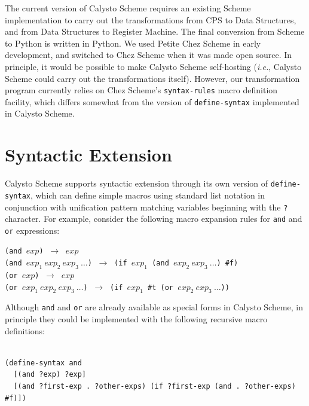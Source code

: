 \documentclass[acmsmall,screen,authorversion]{acmart}
\begin{document}
The current version of Calysto Scheme requires an existing Scheme
implementation to carry out the transformations from CPS to Data Structures,
and from Data Structures to Register Machine.  The final conversion from Scheme
to Python is written in Python.  We used Petite Chez Scheme in early
development, and switched to Chez Scheme when it was made open source. In
principle, it would be possible to make Calysto Scheme self-hosting
(\emph{i.e.}, Calysto Scheme could carry out the transformations
itself). However, our transformation program currently relies on Chez Scheme's
\texttt{syntax-rules} macro definition facility, which differs somewhat from
the version of \texttt{define-syntax} implemented in Calysto Scheme.

\section{Syntactic Extension}

\noindent
Calysto Scheme supports syntactic extension through its own version of
\texttt{define-syntax}, which can define simple macros using standard list
notation in conjunction with unification pattern matching variables beginning
with the \texttt{?} character.  For example, consider the following macro
expansion rules for \texttt{and} and \texttt{or} expressions:\\

\begin{minipage}{\textwidth}
\texttt{(and $\mathit{exp}$)} $~\rightarrow~$ $\mathit{exp}$\\
\texttt{(and $\mathit{exp}_1~\mathit{exp}_2~\mathit{exp}_3~\ldots$)} $~\rightarrow~$
\texttt{(if $\mathit{exp}_1$ (and $\mathit{exp}_2~\mathit{exp}_3~\ldots$) \#f)}\\

\texttt{(or $\mathit{exp}$)} $~\rightarrow~$ $\mathit{exp}$\\
\texttt{(or $\mathit{exp}_1~\mathit{exp}_2~\mathit{exp}_3~\ldots$)} $~\rightarrow~$
\texttt{(if $\mathit{exp}_1$ \#t (or $\mathit{exp}_2~\mathit{exp}_3~\ldots$))}\\
\end{minipage}

\noindent
Although \texttt{and} and \texttt{or} are already available as special forms in
Calysto Scheme, in principle they could be implemented with the following
recursive macro definitions:

\begin{minipage}{\textwidth}
\begin{verbatim}

(define-syntax and
  [(and ?exp) ?exp]
  [(and ?first-exp . ?other-exps) (if ?first-exp (and . ?other-exps) #f)])

\end{verbatim}
\end{minipage}
\end{document}
